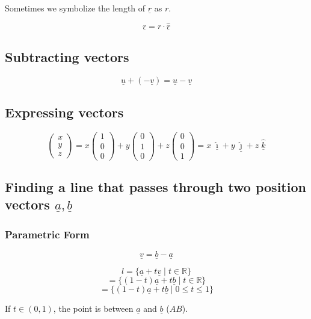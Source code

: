 \documentclass[00_complete]{subfiles}
\begin{document}
Sometimes we symbolize the length of $\underline r$ as $r$.

$$\underline r = r \cdot \underline{\hat r}$$

\subsection{Subtracting vectors}

$$\underline u + (-\underline v) = \underline u - \underline v$$

\subsection{Expressing vectors}

$$\begin{pmatrix}
    x\\y\\z
\end{pmatrix} = x\begin{pmatrix}
    1\\0\\0
\end{pmatrix} + y\begin{pmatrix}
    0\\1\\0
\end{pmatrix} + z\begin{pmatrix}
    0\\0\\1
\end{pmatrix}
= x\;\underline{\hat \imath} + y\;\underline{\hat \jmath} + z\;\underline{\hat k}$$

\subsection{Finding a line that passes through two position vectors
\texorpdfstring{$\underline a,\underline b$}{a, b}}

\subsubsection{Parametric Form}

$$\underline v = \underline b - \underline a$$

$$l = \{ \underline a + t \underline v \;|\; t \in \mathbb{R}\}$$
$$= \{(1-t)\underline a + t \underline b \;|\; t \in \mathbb{R}\}$$
$$= \{(1-t)\underline a + t \underline b \;|\; 0 \leq t \leq 1\}$$

If $t \in (0,1)$, the point is between $\underline a$ and $\underline b$ ($AB$).
\end{document}
